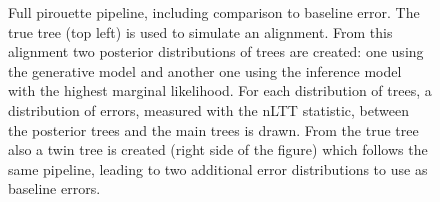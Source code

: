 \begin{figure}[H]
{
  }
  \caption{Full pirouette pipeline, including comparison to baseline error. 
    The true tree (top left) is used to simulate an alignment. 
    From this alignment two posterior distributions of trees are created: 
    one using the generative model and another one using the inference model 
    with the highest marginal likelihood. 
    For each distribution of trees, a distribution of errors, 
    measured with the nLTT statistic, 
    between the posterior trees and the main trees is drawn. 
    From the true tree also a twin tree is created (right side of the figure)
    which follows the same pipeline, 
    leading to two additional error distributions to use as baseline errors.}
  \label{fig:example_30_full_pipeline}
\end{figure}

